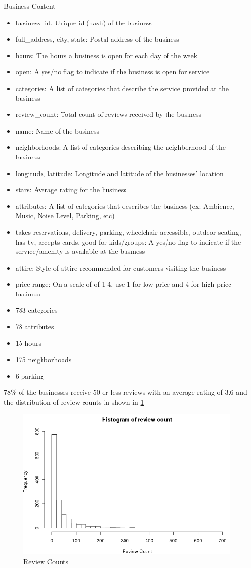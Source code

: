 \documentclass[12pt]{article}
\begin{document}
Business Content
\begin{itemize}
	\item business\_id: Unique id (hash) of the business
	\item full\_address, city, state: Postal address of the business
	\item hours: The hours a business is open for each day of the week
	\item open: A yes/no flag to indicate if the business is open for service
	\item categories: A list of categories that describe the service provided at the business
	\item review\_count: Total count of reviews received by the business
	\item name: Name of the business
	\item neighborhoods: A list of categories describing the neighborhood of the business
	\item longitude, latitude: Longitude and latitude of the businesses' location
	\item stars: Average rating for the business
	\item attributes: A list of categories that describes the business (ex: Ambience, Music, Noise Level, Parking, etc)
	\item takes reservations, delivery, parking, wheelchair accessible, outdoor seating, has tv, accepts cards, good for kids/groups: A yes/no flag to indicate if the service/amenity is available at the business
	\item attire: Style of attire recommended for customers visiting the business
	\item price range: On a scale of of 1-4, use 1 for low price and 4 for high price business
	
	\item 783 categories
	\item 78 attributes
	\item 15 hours
	\item 175 neighborhoods
	\item 6 parking
\end{itemize}

$78\%$ of the businesses receive $50$ or less reviews with an average rating of $3.6$ and the distribution of review counts in shown in \ref{fig:histogram_review_count}

\begin{figure}[h]
\centering
\includegraphics[width=0.7\linewidth]{histogram_review_count}
\caption{Review Counts}
\label{fig:histogram_review_count}
\end{figure}
\end{document}
